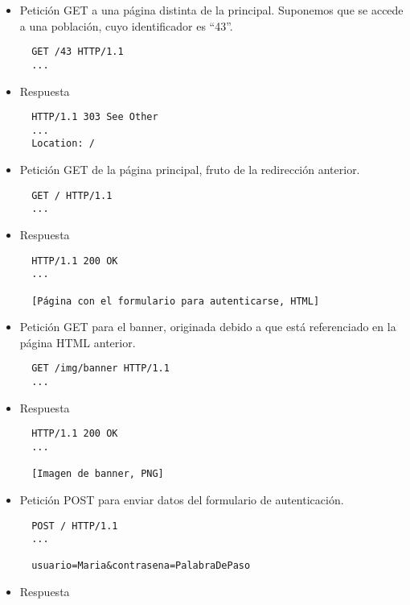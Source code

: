 \begin{itemize}
\item Petición GET a una página distinta de la principal.
  Suponemos que se accede a una población, cuyo identificador es ``43''.

\begin{verbatim}
  GET /43 HTTP/1.1
  ...
\end{verbatim}

\item Respuesta

\begin{verbatim}
  HTTP/1.1 303 See Other
  ...
  Location: /
\end{verbatim}


\item Petición GET de la página principal, fruto de la redirección anterior.

\begin{verbatim}
  GET / HTTP/1.1
  ...
\end{verbatim}

\item Respuesta

\begin{verbatim}
  HTTP/1.1 200 OK
  ...

  [Página con el formulario para autenticarse, HTML]
\end{verbatim}


\item Petición GET para el banner, originada debido a que está referenciado
  en la página HTML anterior.

\begin{verbatim}
  GET /img/banner HTTP/1.1
  ...
\end{verbatim}

\item Respuesta

\begin{verbatim}
  HTTP/1.1 200 OK
  ...

  [Imagen de banner, PNG]
\end{verbatim}
  

\item Petición POST para enviar datos del formulario de autenticación.

\begin{verbatim}
  POST / HTTP/1.1
  ...

  usuario=Maria&contrasena=PalabraDePaso
\end{verbatim}

\item Respuesta


\end{itemize}
